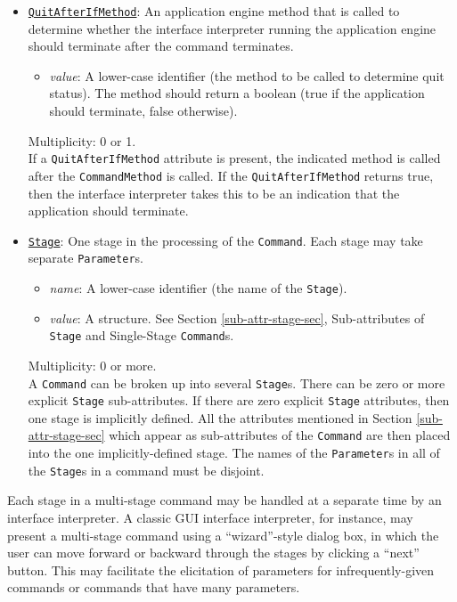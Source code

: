 \documentclass[11pt]{article}
\begin{document}
\begin{itemize}
\item \underline{\tt QuitAfterIfMethod}:  An application engine method
that is called to determine whether the interface interpreter running the
application engine should terminate after the command terminates.
\begin{itemize}
\item {\it value}: A lower-case identifier (the method to be
  called to determine quit status).
  The method should return a boolean (true if the application
  should terminate, false otherwise).
\end{itemize}
Multiplicity: 0 or 1. \\
If a {\tt QuitAfterIfMethod} attribute is present, the indicated method
is called after the {\tt CommandMethod} is called.  If the
{\tt QuitAfterIfMethod} returns true, then the interface interpreter
takes this to be an indication that the application should
terminate.

\item \underline{\tt Stage}:  One stage in the processing of the
{\tt Command}.  Each stage may take separate {\tt Parameter}s.
\begin{itemize}
\item {\it name}: A lower-case identifier (the name of the {\tt Stage}).
\item {\it value}: A structure.  See Section
  \ref{sub-attr-stage-sec}, Sub-attributes of {\tt Stage} and
  Single-Stage {\tt Command}s.
\end{itemize}
Multiplicity: 0 or more. \\
A {\tt Command} can be broken up into several {\tt Stage}s.
There can be zero or more explicit {\tt Stage} sub-attributes.
If there are zero explicit {\tt Stage} attributes, then
one stage is implicitly defined.
All the attributes mentioned in Section \ref{sub-attr-stage-sec}
which appear as sub-attributes of the {\tt Command} are then
placed into the one implicitly-defined stage.
The names of the {\tt Parameter}s in all of the {\tt Stage}s in a command
must be disjoint.

\end{itemize}

Each stage in a multi-stage command may be handled at a separate time by
an interface interpreter.  A classic GUI interface interpreter, for
instance, may present a multi-stage command using a ``wizard''-style
dialog box, in which the user can move forward or backward through the
stages by clicking a ``next'' button.  This may facilitate the elicitation
of parameters for infrequently-given commands or commands that have many
parameters.
\end{document}
